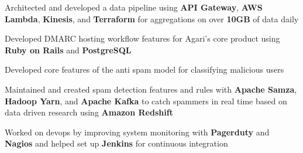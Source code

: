 \documentclass[]{peter_resume}
\begin{document}
\begin{minipage}{\textwidth}
 
\begin{tightemize}
\item Architected and developed a data pipeline using \textbf{API Gateway}, \textbf{AWS Lambda}, \textbf{Kinesis}, and \textbf{Terraform} for aggregations on over \textbf{10GB} of data daily
\item Developed DMARC hosting workflow features for Agari's core product using \textbf{Ruby on Rails} and \textbf{PostgreSQL}
\end{tightemize}
\sectionsep

 
\begin{tightemize}
\item Developed core features of the anti spam model for classifying malicious users
\item Maintained and created spam detection features and rules with \textbf{Apache Samza}, \textbf{Hadoop Yarn}, and \textbf{Apache Kafka} to catch spammers in real time based on data driven research using \textbf{Amazon Redshift}
\item Worked on devops by improving system monitoring with \textbf{Pagerduty} and \textbf{Nagios} and helped set up \textbf{Jenkins} for continuous integration
\end{tightemize}
\sectionsep

\begin{comment}
\runsubsection{Veeva Systems}\location{Toronto, ON} \daterange{\hfill Sept 2015 – Dec 2015}
\descript{Network Developer Intern}
\begin{tightemize}
\item Designed and created a localization framework for quickly exporting and updating translated labels
\item Improved dataflow performance by reducing parsing processing times by \textbf{10\%} %
\item Maintained existing features using \textbf{Spring}, \textbf{MySQL}, \textbf{Apache Tomcat}, and \textbf{JMVC}
\end{tightemize}
\sectionsep

\runsubsection{Plastic Mobile}\location{Toronto, ON} \daterange{\hfill Jan 2015 – Apr 2015}
\descript{Software Engineer Intern}
\begin{tightemize}
\item Created a smartdoor authentication system and architected backend API with \textbf{Django}
\item Wrote and set up automated testing scripts for iOS applications using \textbf{Calabash-iOS} with \textbf{Cucumber} and \textbf{Gherkin}
\end{tightemize}
\sectionsep


\end{comment}
\end{minipage}
\end{document}
